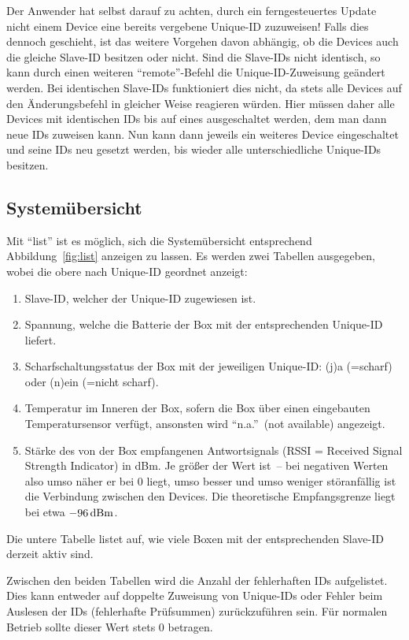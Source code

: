\documentclass[pdftex, parskip, numbers=noenddot, toc=listof]{scrbook}
\begin{document}
	Der Anwender hat selbst darauf zu achten, durch ein ferngesteuertes Update nicht einem Device eine bereits vergebene Unique-ID zuzuweisen! Falls dies dennoch geschieht, ist das weitere Vorgehen davon abhängig, ob die Devices auch die gleiche Slave-ID besitzen oder nicht. Sind die Slave-IDs nicht identisch, so kann durch einen weiteren \enquote{remote}-Befehl die Unique-ID-Zuweisung geändert werden. Bei identischen Slave-IDs funktioniert dies nicht, da stets alle Devices auf den Änderungsbefehl in gleicher Weise reagieren würden. Hier müssen daher alle Devices mit identischen IDs bis auf eines ausgeschaltet werden, dem man dann neue IDs zuweisen kann. Nun kann dann jeweils ein weiteres Device eingeschaltet und seine IDs neu gesetzt werden, bis wieder alle unterschiedliche Unique-IDs besitzen.

	\subsection{Systemübersicht}
	\label{sec:list}

	Mit \enquote{list} ist es möglich, sich die Systemübersicht entsprechend Abbildung~\ref{fig:list} anzeigen zu lassen. Es werden zwei Tabellen ausgegeben, wobei die obere nach Unique-ID geordnet anzeigt:
	\begin{enumerate}
		\item Slave-ID, welcher der Unique-ID zugewiesen ist.
		\item Spannung, welche die Batterie der Box mit der entsprechenden Unique-ID liefert.
		\item Scharfschaltungsstatus der Box mit der jeweiligen Unique-ID: (j)a (=scharf) oder (n)ein (=nicht scharf).
		\item Temperatur im Inneren der Box, sofern die Box über einen eingebauten Temperatursensor verfügt, ansonsten wird \enquote{n.a.}~(not available) angezeigt.
		\item Stärke des von der Box empfangenen Antwortsignals (RSSI = Received Signal Strength Indicator) in dBm. Je größer der Wert ist~-- bei negativen Werten also umso näher er bei 0 liegt, umso besser und umso weniger störanfällig ist die Verbindung zwischen den Devices. Die theoretische Empfangsgrenze liegt bei etwa $\unit[-96]{dBm}$.
	\end{enumerate}

	Die untere Tabelle listet auf, wie viele Boxen mit der entsprechenden Slave-ID derzeit aktiv sind.

	Zwischen den beiden Tabellen wird die Anzahl der fehlerhaften IDs aufgelistet. Dies kann entweder auf doppelte Zuweisung von Unique-IDs oder Fehler beim Auslesen der IDs (fehlerhafte Prüfsummen) zurückzuführen sein. Für normalen Betrieb sollte dieser Wert stets 0 betragen.
\end{document}

